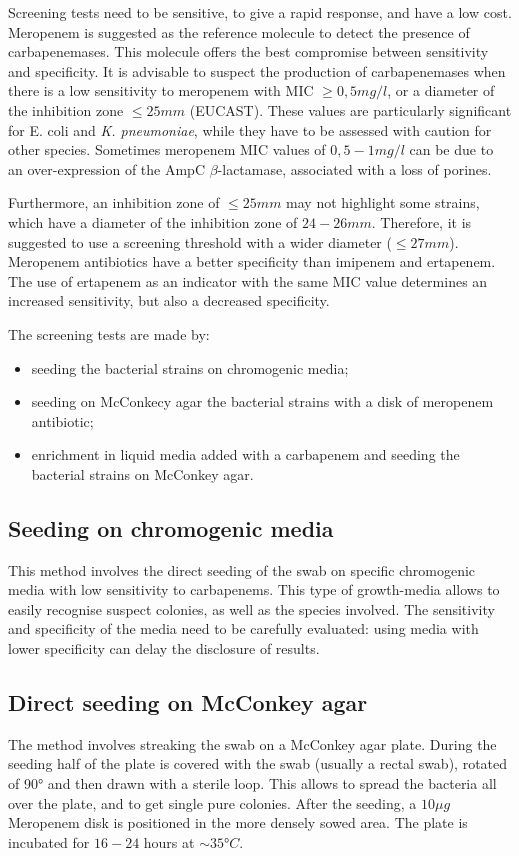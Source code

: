 \documentclass[11pt]{report}
\begin{document}
Screening tests need to be sensitive, to give a rapid response, and have a low cost.
Meropenem is suggested as the reference molecule to detect the presence of carbapenemases.
This molecule offers the best compromise between sensitivity and specificity.
It is advisable to suspect the production of carbapenemases when there is a low sensitivity to meropenem with MIC $\ge 0,5 mg/l$, or a diameter of the inhibition zone $\le 25 mm$ (EUCAST).
These values are particularly significant for E. coli and \emph{K. pneumoniae}, while they have to be assessed with caution for other species.
Sometimes meropenem MIC values of $0,5-1 mg/l$ can be due to an over-expression of the AmpC $\beta$-lactamase, associated with a loss of porines.

Furthermore, an inhibition zone of $\le 25 mm$ may not highlight some strains, which have a diameter of the inhibition zone of $24-26 mm$.
Therefore, it is suggested to use a screening threshold with a wider diameter ($\le 27 mm$).
Meropenem antibiotics have a better specificity than imipenem and ertapenem.
The use of ertapenem as an indicator with the same MIC value determines an increased sensitivity, but also a decreased specificity.

The screening tests are made by:
\begin{itemize}
\item seeding the bacterial strains on chromogenic media;
\item seeding on McConkecy agar the bacterial strains with a disk of meropenem antibiotic;
\item enrichment in liquid media added with a carbapenem and seeding the bacterial strains on McConkey agar.
\end{itemize}

\subsection{Seeding on chromogenic media}
This method involves the direct seeding of the swab on specific chromogenic media with low sensitivity to carbapenems.
This type of growth-media allows to easily recognise suspect colonies, as well as the species involved.
The sensitivity and specificity of the media need to be carefully evaluated: using media with lower specificity can delay the disclosure of results.

\subsection{Direct seeding on McConkey agar}
The method involves streaking the swab on a McConkey agar plate.
During the seeding half of the plate is covered with the swab (usually a rectal swab), rotated of 90° and then drawn with a sterile loop.
This allows to spread the bacteria all over the plate, and to get single pure colonies.
After the seeding, a $10\mu g$ Meropenem disk is positioned in the more densely sowed area.
The plate is incubated for $16-24$ hours at $\sim 35°C$.
\end{document}
